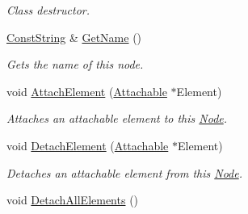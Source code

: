 \begin{DoxyCompactItemize}
\begin{DoxyCompactList}\small\item\em Class destructor. \item\end{DoxyCompactList}\item 
\hyperlink{namespacephys_a5ce5049f8b4bf88d6413c47b504ebb31}{ConstString} \& \hyperlink{classphys_1_1Node_a2db8f0717abc20a43b7154bdc99ecf0e}{GetName} ()
\begin{DoxyCompactList}\small\item\em Gets the name of this node. \item\end{DoxyCompactList}\item 
void \hyperlink{classphys_1_1Node_a8de0f86b08510a08a6e6c0912c9caddb}{AttachElement} (\hyperlink{classphys_1_1Attachable}{Attachable} $\ast$Element)
\begin{DoxyCompactList}\small\item\em Attaches an attachable element to this \hyperlink{classphys_1_1Node}{Node}. \item\end{DoxyCompactList}\item 
void \hyperlink{classphys_1_1Node_afdafaa00a4c6873211968529993a2b48}{DetachElement} (\hyperlink{classphys_1_1Attachable}{Attachable} $\ast$Element)
\begin{DoxyCompactList}\small\item\em Detaches an attachable element from this \hyperlink{classphys_1_1Node}{Node}. \item\end{DoxyCompactList}\item 
\hypertarget{classphys_1_1Node_a8c0da465ac3b751cd4c124bf3157ce6b}{
void \hyperlink{classphys_1_1Node_a8c0da465ac3b751cd4c124bf3157ce6b}{DetachAllElements} ()}
\label{d0/ddc/classphys_1_1Node_a8c0da465ac3b751cd4c124bf3157ce6b}


\end{DoxyCompactItemize}
